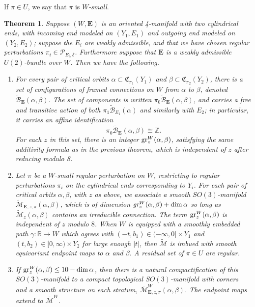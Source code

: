 \documentclass[10pt,a4paper]{amsart}
\newtheorem{theorem}{Theorem}
\theoremstyle{definition}
\theoremstyle{remark}
\numberwithin{figure}{qchap}
\begin{document}
If $\pi \in U$, we say that $\pi$ is \emph{$W$-small}.

\begin{theorem}\label{CobordismPackage}Suppose $(W,\mathbf{E})$ is an oriented 4-manifold with two cylindrical ends, with incoming end modeled on $(Y_1,E_1)$ and outgoing end modeled on $(Y_2,E_2)$; suppose the $E_i$ are weakly admissible, and that we have chosen regular perturbations $\pi_i \in \mathcal P_{E_i, \delta}$. Furthermore suppose that $\mathbf{E}$ is a weakly admissible $U(2)$-bundle over $W$. Then we have the following.
\begin{enumerate}
\item For every pair of critical orbits $\alpha \subset \mathfrak C_{\pi_1}(Y_1)$ and $\beta \subset \mathfrak C_{\pi_2}(Y_2)$, there is a set of configurations of framed connections on $W$ from $\alpha$ to $\beta$, denoted $\widetilde{\mathcal B}_{\mathbf{E}}(\alpha, \beta)$. The set of components is written $\pi_0 \widetilde{\mathcal B}_{\mathbf{E}}(\alpha, \beta)$, and carries a free and transitive action of both $\pi_1 \widetilde{\mathcal B}_{E_1}(\alpha)$ and similarly with $E_2$; in particular, it carries an affine identification $$\pi_0 \widetilde{\mathcal B}_{\mathbf{E}}(\alpha, \beta) \cong \mathbb Z.$$ For each $z$ in this set, there is an integer $\textup{gr}^W_z(\alpha, \beta)$, satisfying the same additivity formula as in the previous theorem, which is independent of $z$ after reducing modulo 8. \\
\item Let $\pi$ be a $W$-small regular perturbation on $W$, restricting to regular perturbations $\pi_i$ on the cylindrical ends corresponding to $Y_i$. For each pair of critical orbits $\alpha, \beta$, with $z$ as above, we associate a smooth $SO(3)$-manifold $\widetilde{\mathcal M}_{\mathbf{E},z,\pi}(\alpha, \beta)$, which is of dimension $\text{\em{gr}}^W_z(\alpha, \beta)+\dim \alpha$ so long as $\widetilde{\mathcal M}_z(\alpha, \beta)$ contains an irreducible connection. The term $\textup{gr}^W_z(\alpha, \beta)$ is independent of $z$ modulo $8$. When $W$ is equipped with a smoothly embedded path $\gamma: \mathbb R \to W$ which agrees with $(-t,b_1) \in (-\infty, 0] \times Y_1$ and $(t, b_2) \in [0,\infty) \times Y_2$ for large enough $|t|$, then $\widetilde{\mathcal M}$ is imbued with smooth equivariant endpoint maps to $\alpha$ and $\beta$. A residual set of $\pi \in U$ are regular.\\
\item If $\textup{gr}^W_z(\alpha, \beta) \leq 10 - \dim \alpha$, then there is a natural compactification of this $SO(3)$-manifold to a compact topological $SO(3)$-manifold with corners and a smooth structure on each stratum, $\overline{\mathcal M}^W_{\mathbf{E},z,\pi}(\alpha, \beta)$. The endpoint maps extend to $\overline{\mathcal M}^W$.\\

\end{enumerate}
\end{theorem}
\end{document}

